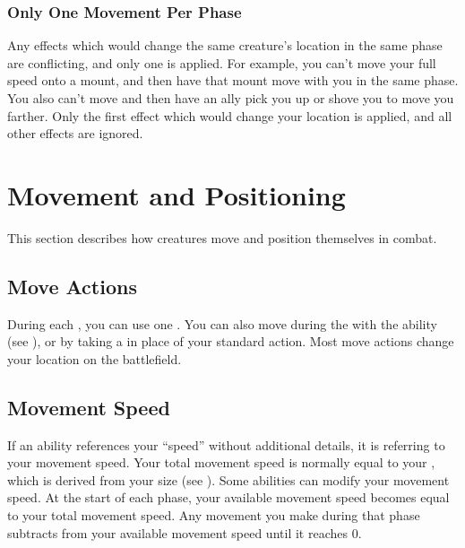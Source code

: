     \subsubsection{Only One Movement Per Phase}\label{Only One Movement Per Phase}
      Any effects which would change the same creature's location in the same phase are conflicting, and only one is applied.
      For example, you can't move your full speed onto a mount, and then have that mount move with you in the same phase.
      You also can't move and then have an ally pick you up or shove you to move you farther.
      Only the first effect which would change your location is applied, and all other effects are ignored.

\section{Movement and Positioning}\label{Movement and Positioning}
  This section describes how creatures move and position themselves in combat.

  \subsection{Move Actions}\label{Move Actions}
    During each , you can use one .
    You can also move during the  with the  ability (see ), or by taking a  in place of your standard action.
    Most move actions change your location on the battlefield.

  \subsection{Movement Speed}\label{Movement Speed}
    If an ability references your ``speed'' without additional details, it is referring to your movement speed.
    Your total movement speed is normally equal to your , which is derived from your size (see ).
    Some abilities can modify your movement speed.
    At the start of each phase, your available movement speed becomes equal to your total movement speed.
    Any movement you make during that phase subtracts from your available movement speed until it reaches 0.

